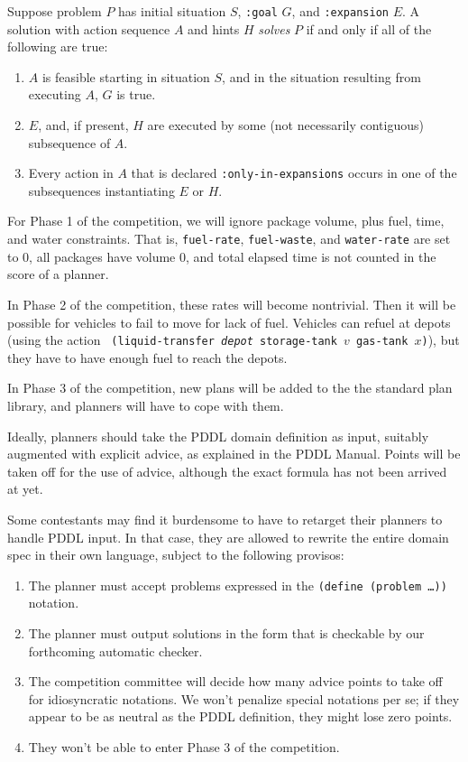 \documentclass{article}
\begin{document}
Suppose problem $P$ has initial situation $S$, {\tt :goal} $G$, and {\tt :expansion} $E$.
A solution with action sequence $A$ and hints $H$ 
{\em solves} $P$ if and only if all of the following are
true:
\begin{enumerate}
\item $A$ is feasible starting in situation $S$, and in the situation
resulting from executing $A$, $G$ is true.
\item $E$, and, if present, $H$ are executed by some (not necessarily
contiguous) subsequence of $A$.
\item Every action in $A$ that is declared {\tt :only-in-expansions}
occurs in one of the subsequences instantiating $E$ or $H$.
\end{enumerate}

For Phase 1 of the competition, we will ignore package volume, plus fuel, time, and
water constraints.  That is, {\tt fuel-rate}, {\tt fuel-waste}, and
{\tt water-rate} are 
set to 0, all packages have volume 0, 
and total elapsed time is not counted in the score of a
planner.

In Phase 2 of the competition, these rates will become nontrivial.
Then it will be possible for vehicles to fail to move for lack of
fuel.  Vehicles can refuel at depots (using the action {\tt
(liquid-transfer {\it depot} storage-tank $v$ gas-tank $x$)}), but
they have to have enough fuel to reach the depots.

In Phase 3 of the competition, new plans will be added to the 
the standard plan library, and planners will have to cope with them.

Ideally, planners should take the PDDL domain definition as input,
suitably augmented with explicit advice, as explained in the PDDL
Manual.  Points will be taken off for the use of advice, although the
exact formula has not been arrived at yet.

Some contestants may find it burdensome to have to retarget their
planners to handle PDDL input.  In that case, they are allowed to
rewrite the entire domain spec in their own language, subject to the
following provisos:
\begin{enumerate}
\item The planner must accept problems expressed in the {\tt (define
(problem \ldots))} notation.

\item The planner must output solutions in the form that is checkable
by our forthcoming automatic checker.

\item The competition committee will decide how many advice points to
take off for idiosyncratic notations.  We won't penalize special
notations per se; if they appear to be as neutral as the PDDL
definition, they might lose zero points.

\item They won't be able to enter Phase 3 of the competition.
\end{enumerate}
\end{document}
